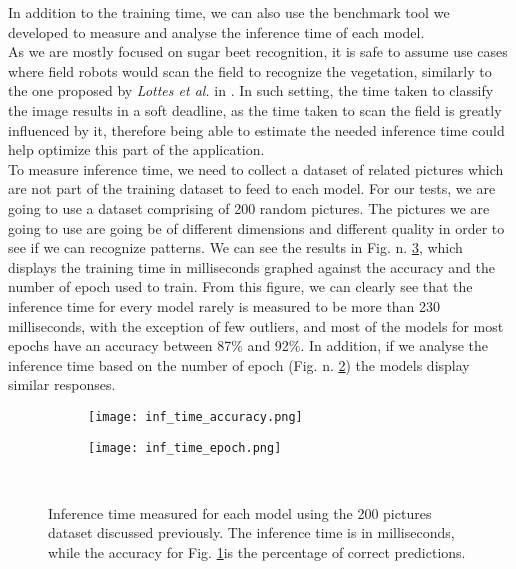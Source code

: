 In addition to the training time, we can also use the benchmark tool we developed to measure and analyse the inference time of each model.\\
As we are mostly focused on sugar beet recognition, it is safe to assume use cases where field robots would scan the field to recognize the vegetation, similarly to the one proposed by \textit{Lottes et al.} in \cite{7487720}. In such setting, the time taken to classify the image results in a soft deadline, as the time taken to scan the field is greatly influenced by it, therefore being able to estimate the needed inference time could help optimize this part of the application. \\
To measure inference time, we need to collect a dataset of related pictures which are not part of the training dataset to feed to each model. For our tests, we are going to use a dataset comprising of 200 random pictures. The pictures we are going to use are going be of different dimensions and different quality in order to see if we can recognize patterns. We can see the results in Fig. n. \ref{fig:inf_time_epoch_c}, which displays the training time in milliseconds graphed against the accuracy and the number of epoch used to train. From this figure, we can clearly see that the inference time for every model rarely is measured to be more than 230 milliseconds, with the exception of few outliers, and most of the models for most epochs have an accuracy between 87\% and 92\%. In addition, if we analyse the inference time based on the number of epoch (Fig. n. \ref{fig:inf_time_epoch}) the models display similar responses.  \\


\begin{figure}[h]
     \begin{subfigure}{0.5\textwidth}
	    \texttt{[image: inf\_time\_accuracy.png]}
	    \caption{}
         \label{fig:inf_time_accuracy}
     \end{subfigure}
     \hfill
     \begin{subfigure}{0.5\textwidth}
	    \texttt{[image: inf\_time\_epoch.png]}
	    \caption{}
        \label{fig:inf_time_epoch}
     \end{subfigure}\\
     \caption[Inference time measured for each model]{Inference time measured for each model using the 200 pictures dataset discussed previously. The inference time is in milliseconds, while the accuracy for Fig. \ref{fig:inf_time_accuracy}is the percentage of correct predictions.}
        \label{fig:inf_time_epoch_c}
\end{figure}

